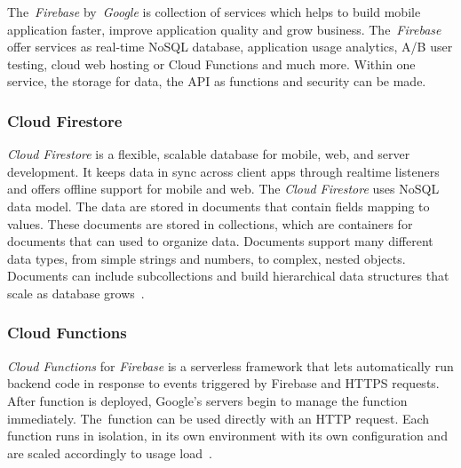 The~\textit{Firebase} by~\textit{Google} is collection of services which helps to build mobile application faster, improve application quality and grow business. The~\textit{Firebase} offer services as real-time NoSQL database, application usage analytics, A/B user testing, cloud web hosting or Cloud Functions and much more. Within one service, the storage for data, the API as functions and security can be made. 

\subsubsection{Cloud Firestore}
\textit{Cloud Firestore} is a flexible, scalable database for mobile, web, and server development. It keeps data in sync across client apps through realtime listeners and offers offline support for mobile and web. The \textit{Cloud Firestore} uses NoSQL data model. The data are stored in documents that contain fields mapping to values. These documents are stored in collections, which are containers for documents that can used to organize data. Documents support many different data types, from simple strings and numbers, to complex, nested objects. Documents can include subcollections and build hierarchical data structures that scale as database grows~\cite{cloud-firestore}.

\subsubsection{Cloud Functions}
\textit{Cloud Functions} for \textit{Firebase} is a serverless framework that lets automatically run backend code in response to events triggered by Firebase and HTTPS requests. After function is deployed, Google's servers begin to manage the function immediately. The~function can be used directly with an HTTP request. Each function runs in isolation, in its own environment with its own configuration and are scaled accordingly to usage load~\cite{cloud-functions}. 

